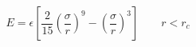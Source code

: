 


$$
 E = \epsilon \left[ \frac{2}{15} \left(\frac{\sigma}{r}\right)^{9} - 
                       \left(\frac{\sigma}{r}\right)^3 \right]
                       \qquad r < r_c
$$

